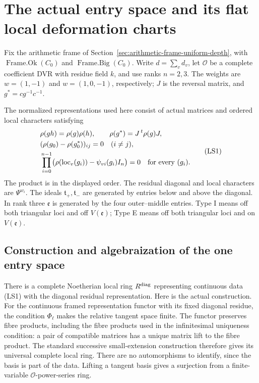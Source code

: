\section{The actual entry space and its flat local deformation charts}
\label{sec:entry-space-flat}

Fix the arithmetic frame of
Section~\ref{sec:arithmetic-frame-uniform-depth},
with \(\operatorname{Frame.Ok}(C_0)\) and
\(\operatorname{Frame.Big}(C_0)\).
Write \(d=\sum_vd_v\), let \(\mathcal O\) be a complete
coefficient DVR with residue field \(k\), and use ranks
\(n=2,3\).
The weights are \(w=(1,-1)\) and \(w=(1,0,-1)\),
respectively; \(J\) is the reversal matrix, and
\(g^*=cg^{-1}c^{-1}\).

The normalized representations used here consist of
actual matrices and ordered local characters satisfying
\[
 \begin{split}
 &\rho(gh)=\rho(g)\rho(h),\qquad
                 \rho(g^*)=J\,{}^t\rho(g)J,\\
 &(\rho(g_0)-\rho(g_0^*))_{ij}=0\quad(i\ne j),\\
 &\prod_{i=0}^{n-1}
       \bigl(\rho(\operatorname{loc}_v(g_i))
                         -\psi_{vi}(g_i)I_n\bigr)=0
                                  \quad\hbox{for every }(g_i).
 \end{split}                                                  \tag{LS1}
\]
The product is in the displayed order.
The residual diagonal and local characters are
\(\Psi^{w_i}\).
The ideals \(\mathfrak t_+,\mathfrak t_-\) are generated
by entries below and above the diagonal.
In rank three \(\mathfrak e\) is generated by the four
outer--middle entries.
Type I means off both triangular loci and off
\(V(\mathfrak e)\); Type E means off both triangular
loci and on \(V(\mathfrak e)\).

\subsection{Construction and algebraization of the one entry space}
There is a complete Noetherian local ring
\(R^{\rm diag}\) representing continuous data (LS1)
with the diagonal residual representation.
Here is the actual construction.
For the continuous framed representation functor
with its fixed diagonal residue, the condition
\(\Phi_\ell\) makes the relative tangent space finite.
The functor preserves fibre products, including the
fibre products used in the infinitesimal uniqueness
condition: a pair of compatible matrices has a
unique matrix lift to the fibre product.
The standard successive small-extension construction
therefore gives its universal complete local ring.
There are no automorphisms to identify, since the
basis is part of the data.
Lifting a tangent basis gives a surjection from a
finite-variable \(\mathcal O\)-power-series ring.

